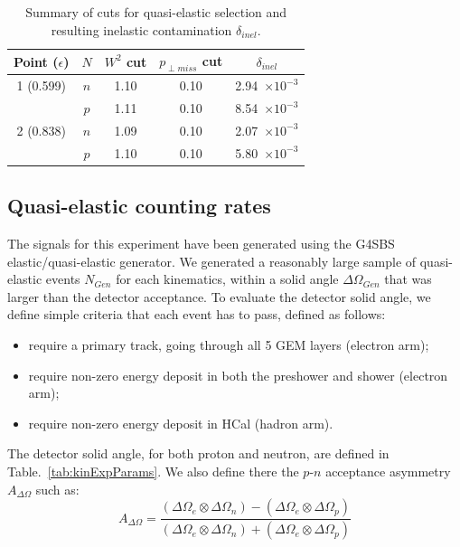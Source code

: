 \begin{table}[h]
\centering
\begin{tabular}{|c|c|c|c|c|}
\hline
Point ($\epsilon$) & $N$ & $W^2$ cut & $p_{\perp miss}$ cut & $\delta_{inel}$ \\
\hline
1 (0.599) & $n$ & 1.10 & 0.10 & 2.94~$\times 10^{-3}$ \\
 & $p$ & 1.11 & 0.10 & 8.54~$\times 10^{-3}$ \\
\hline
2 (0.838) & $n$ & 1.09 & 0.10 & 2.07~$\times 10^{-3}$ \\
 & $p$ & 1.10 & 0.10 & 5.80~$\times 10^{-3}$ \\
\hline
\end{tabular} 
\caption{Summary of cuts for quasi-elastic selection and resulting inelastic contamination $\delta_{inel}$.}
\label{tab:contam}
\end{table}

\fi

\subsection{Quasi-elastic counting rates}

The signals for this experiment have been generated using the G4SBS elastic/quasi-elastic generator. 
We generated a reasonably large sample of quasi-elastic events $N_{Gen}$ for each kinematics, within a solid angle $\Delta\Omega_{Gen}$ that was larger than the detector acceptance.
To evaluate the detector solid angle, we define simple criteria that each event has to pass, defined as follows:
%
\begin{itemize}
\item{require a primary track, going through all 5 GEM layers (electron arm);}
\item{require non-zero energy deposit in both the preshower and shower (electron arm);}
\item{require non-zero energy deposit in HCal (hadron arm).}
\end{itemize}
%
The detector solid angle, for both proton and neutron, are defined in Table.~\ref{tab:kinExpParams}.
We also define there the $p$-$n$ acceptance asymmetry $A_{\Delta\Omega}$ such as:
\begin{equation}
  A_{\Delta\Omega} = \frac{(\Delta\Omega_e \otimes \Delta\Omega_n)-(\Delta\Omega_e \otimes \Delta\Omega_p)}{(\Delta\Omega_e \otimes \Delta\Omega_n)+(\Delta\Omega_e \otimes \Delta\Omega_p)}
\end{equation}

